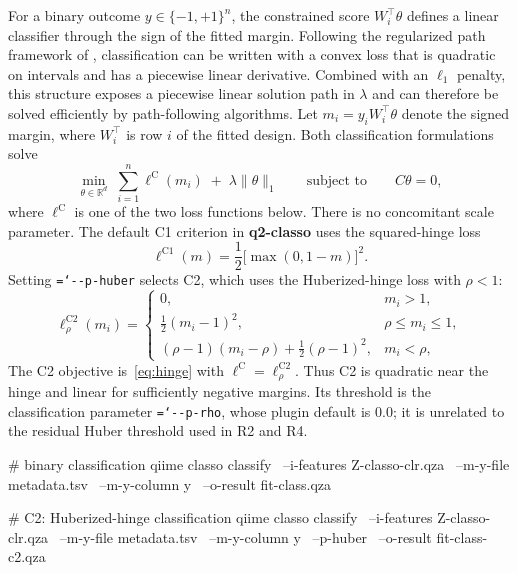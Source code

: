 \documentclass[11pt,a4paper]{article}
\newcommand{\code}[1]{\allowbreak\texttt{\hyphenchar\font=`\-\relax #1}}
\newcommand{\pkg}[1]{\textbf{#1}}
\newcommand{\R}{\mathbb{R}}
\begin{document}
For a binary outcome $y \in \{-1,+1\}^{n}$, the constrained score
$W_i^{\top}\theta$ defines a linear classifier through the sign of the fitted
margin. Following the regularized path framework of
\citet{rosset2007piecewise}, classification can be written with a convex loss
that is quadratic on intervals and has a piecewise linear derivative. Combined
with an $\ell_1$ penalty, this structure exposes a piecewise linear solution
path in $\lambda$ and can therefore be solved efficiently by path-following
algorithms. Let $m_i=y_i W_i^{\top}\theta$ denote the signed margin, where
$W_i^{\top}$ is row $i$ of the fitted design. Both classification formulations
solve
\begin{equation}
\label{eq:hinge}
\min_{\theta \in \R^{d}} \;
\sum_{i=1}^{n}\ell^{\mathrm{C}}(m_i)
\; + \; \lambda \lVert \theta \rVert_{1}
\qquad \text{subject to} \qquad C\theta = 0 ,
\end{equation}
where $\ell^{\mathrm{C}}$ is one of the two loss functions below. There is no
concomitant scale parameter. The default C1 criterion in \pkg{q2-classo} uses
the squared-hinge loss
\[
\ell^{\mathrm{C1}}(m)=\frac{1}{2}\bigl[\max(0,1-m)\bigr]^2.
\]
Setting \code{-{}-p-huber} selects C2, which uses the Huberized-hinge loss
with $\rho<1$:
\begin{equation}
\label{eq:huber-hinge}
\ell^{\mathrm{C2}}_\rho(m_i) =
\begin{cases}
0, & m_i > 1,\\[2pt]
\frac{1}{2}(m_i-1)^2, & \rho \le m_i \le 1,\\[2pt]
(\rho-1)(m_i-\rho)+\frac{1}{2}(\rho-1)^2, & m_i < \rho,
\end{cases}
\end{equation}
The C2 objective is~\eqref{eq:hinge} with
$\ell^{\mathrm{C}}=\ell^{\mathrm{C2}}_\rho$. Thus C2 is quadratic near the hinge and
linear for sufficiently negative margins. Its threshold is the classification
parameter \code{-{}-p-rho}, whose plugin default is $0.0$; it is unrelated to
the residual Huber threshold used in R2 and R4.

\begin{PseudoCode}
# binary classification
qiime classo classify \
    --i-features Z-classo-clr.qza \
    --m-y-file metadata.tsv \
    --m-y-column y \
    --o-result fit-class.qza

# C2: Huberized-hinge classification
qiime classo classify \
    --i-features Z-classo-clr.qza \
    --m-y-file metadata.tsv \
    --m-y-column y \
    --p-huber \
    --o-result fit-class-c2.qza
\end{PseudoCode}
\end{document}
